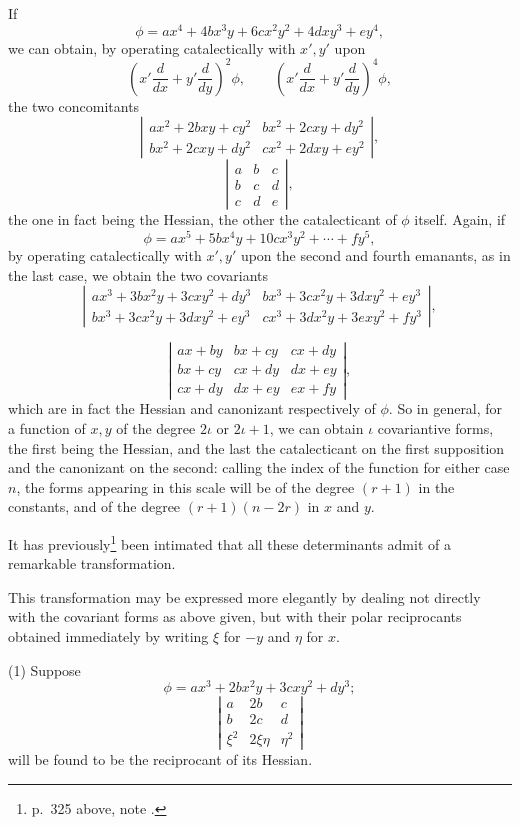 \documentclass[11pt]{article}
\newcommand{\sourcepage}[1]{\marginpar{\scriptsize p.~#1}}
\begin{document}
{{If
\[
\phi=ax^4+4bx^3y+6cx^2y^2+4dxy^3+ey^4,
\]
we can obtain, by operating catalectically with $x',y'$ upon
\[
\left(x'\frac{d}{dx}+y'\frac{d}{dy}\right)^2\phi,\qquad
\left(x'\frac{d}{dx}+y'\frac{d}{dy}\right)^4\phi,
\]
the two concomitants
\[
\left|\begin{array}{cc}
ax^2+2bxy+cy^2&bx^2+2cxy+dy^2\\
bx^2+2cxy+dy^2&cx^2+2dxy+ey^2
\end{array}\right|,
\tag{1}
\]
\[
\left|\begin{array}{ccc}
a&b&c\\
b&c&d\\
c&d&e
\end{array}\right|,
\tag{2}
\]
the one in fact being the Hessian, the other the catalecticant of $\phi$ itself. Again, if
\[
\phi=ax^5+5bx^4y+10cx^3y^2+\cdots+fy^5,
\]
by operating catalectically with $x',y'$ upon the second and fourth emanants, as in the last case, we obtain the two covariants
\[
\left|\begin{array}{cc}
ax^3+3bx^2y+3cxy^2+dy^3&bx^3+3cx^2y+3dxy^2+ey^3\\
bx^3+3cx^2y+3dxy^2+ey^3&cx^3+3dx^2y+3exy^2+fy^3
\end{array}\right|,
\tag{1}
\]

\sourcepage{343}
\[
\left|\begin{array}{ccc}
ax+by&bx+cy&cx+dy\\
bx+cy&cx+dy&dx+ey\\
cx+dy&dx+ey&ex+fy
\end{array}\right|,
\tag{2}
\]
which are in fact the Hessian and canonizant respectively of $\phi$. So in general, for a function of $x,y$ of the degree $2\iota$ or $2\iota+1$, we can obtain $\iota$ covariantive forms, the first being the Hessian, and the last the catalecticant on the first supposition and the canonizant on the second: calling the index of the function for either case $n$, the forms appearing in this scale will be of the degree $(r+1)$ in the constants, and of the degree $(r+1)(n-2r)$ in $x$ and $y$.

It has previously\footnote{p.~325 above, note {\dag}.} been intimated that all these determinants admit of a remarkable transformation.

This transformation may be expressed more elegantly by dealing not directly with the covariant forms as above given, but with their polar reciprocants obtained immediately by writing $\xi$ for $-y$ and $\eta$ for $x$.

(1) Suppose
\[
\phi=ax^3+2bx^2y+3cxy^2+dy^3;
\]
\[
\left|\begin{array}{ccc}
a&2b&c\\
b&2c&d\\
\xi^2&2\xi\eta&\eta^2
\end{array}\right|
\]
will be found to be the reciprocant of its Hessian.

}}
\end{document}
